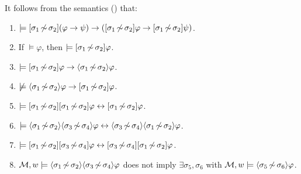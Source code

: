 \begin{proposition}\label{prop:ref-normal-serial}
It follows from the semantics () that:
\begin{enumerate}
\item\label{itm:distref} $\models [{\sigma_1{\,\not\sim\,}\sigma_2}](\varphi \rightarrow \psi) \rightarrow ([{\sigma_1{\,\not\sim\,}\sigma_2}]\varphi \rightarrow
[{\sigma_1{\,\not\sim\,}\sigma_2}]\psi)$.
\item\label{itm:necessitationref} If $\models \varphi$, then $\models [{\sigma_1{\,\not\sim\,}\sigma_2}]\varphi$.
\item\label{itm:serialityref}  $\models [{\sigma_1{\,\not\sim\,}\sigma_2}]\varphi \rightarrow \langle \sigma_1{\,\not\sim\,}\sigma_2 \rangle\varphi$.

\item\label{itm:nodeterref}  $\not\models \langle \sigma_1{\,\not\sim\,}\sigma_2 \rangle\varphi \rightarrow [{\sigma_1{\,\not\sim\,}\sigma_2}]\varphi$.

\item\label{itm:idempref} $\models [{\sigma_1{\,\not\sim\,}\sigma_2}][{\sigma_1{\,\not\sim\,}\sigma_2}]\varphi \leftrightarrow [{\sigma_1{\,\not\sim\,}\sigma_2}]\varphi$.
\item\label{itm:commrefdiam} $\models \langle \sigma_1{\,\not\sim\,}\sigma_2 \rangle\langle \sigma_3{\,\not\sim\,}\sigma_4 \rangle\varphi \leftrightarrow \langle \sigma_3{\,\not\sim\,}\sigma_4 \rangle\langle \sigma_1{\,\not\sim\,}\sigma_2 \rangle\varphi$.
\item\label{itm:commrefbox} $\models [{\sigma_1{\,\not\sim\,}\sigma_2}][{\sigma_3{\,\not\sim\,}\sigma_4}]\varphi \leftrightarrow [{\sigma_3{\,\not\sim\,}\sigma_4}][{\sigma_1{\,\not\sim\,}\sigma_2}]\varphi$.
\item\label{itm:nocollapseref} $\mathcal{M},w \models \langle \sigma_1{\,\not\sim\,}\sigma_2 \rangle\langle \sigma_3{\,\not\sim\,}\sigma_4 \rangle\varphi$ does not imply $\exists \sigma_5, \sigma_6$ with $\mathcal{M},w \models \langle \sigma_5{\,\not\sim\,}\sigma_6 \rangle\varphi$.
\end{enumerate}
\end{proposition}


